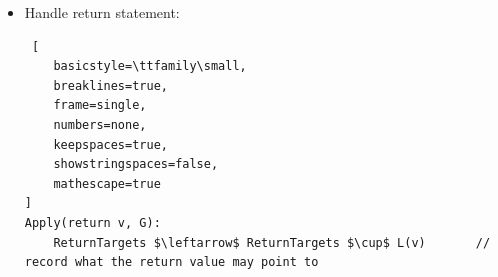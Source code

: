 \begin{itemize}
\begin{lstlisting}[
    basicstyle=\ttfamily\small,
    breaklines=true,
    frame=single,
    numbers=none,
    keepspaces=true,
    showstringspaces=false,
    mathescape=true
]
Apply(v = w[i], G):
    // treated as field load with field = [] (abstract array element)
    targets $\leftarrow$ {}
    for each node n in L(w) do
        targets $\leftarrow$ targets $\cup$ InsideEdgeTargets(n, [])
        if IsPrestateReachable(n) then
            nL $\leftarrow$ fresh LoadNode
            addOutsideEdge(n, [], nL)
            targets $\leftarrow$ targets $\cup$ { nL }
    strongUpdate(v, targets)

Apply(w[i] = v, G):
    for each node n in L(w) do
        recordMutation(n, [])
\end{lstlisting}

\item[h] Handle return statement: \label{agl4h}
\begin{lstlisting} [
    basicstyle=\ttfamily\small,
    breaklines=true,
    frame=single,
    numbers=none,
    keepspaces=true,
    showstringspaces=false,
    mathescape=true
]
Apply(return v, G):
    ReturnTargets $\leftarrow$ ReturnTargets $\cup$ L(v)       // record what the return value may point to
\end{lstlisting}

\end{itemize}